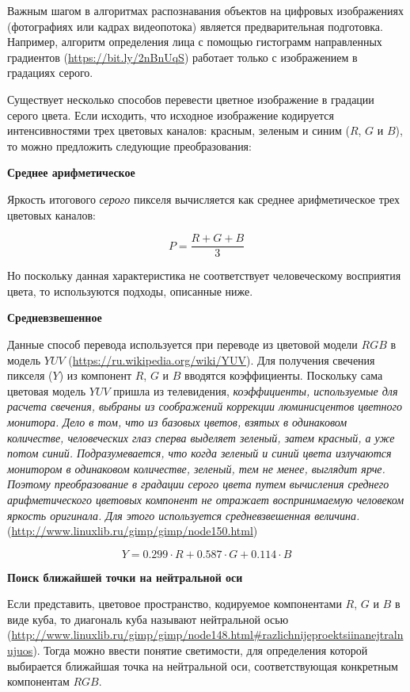 
Важным шагом в алгоритмах распознавания объектов на цифровых изображениях (фотографиях или кадрах видеопотока) является предварительная подготовка.
Например, алгоритм определения лица с помощью гистограмм направленных градиентов (\url{https://bit.ly/2nBnUqS}) работает только с изображением в градациях серого.

Существует несколько способов перевести цветное изображение в градации серого цвета.
Если исходить, что исходное изображение кодируется интенсивностями трех цветовых каналов: красным, зеленым и синим ($R$, $G$ и $B$), то можно предложить следующие преобразования:

\textbf{Среднее арифметическое}

Яркость итогового \textit{серого} пикселя вычисляется как среднее арифметическое трех цветовых каналов:

$$P = \frac{R+G+B}{3}$$

Но поскольку данная характеристика не соответствует человеческому восприятия цвета, то используются подходы, описанные ниже.

\textbf{Средневзвешенное}

Данные способ перевода используется при переводе из цветовой модели $RGB$ в модель $YUV$ (\url{https://ru.wikipedia.org/wiki/YUV}).
Для получения свечения пикселя ($Y$) из компонент $R$, $G$ и $B$ вводятся коэффициенты. Поскольку сама цветовая модель $YUV$ пришла из телевидения, \textit{коэффициенты, используемые для расчета свечения, выбраны из соображений коррекции люминисцентов цветного монитора.
Дело в том, что из базовых цветов, взятых в одинаковом количестве, человеческих глаз сперва выделяет зеленый, затем красный, а уже потом синий. Подразумевается, что когда зеленый и синий цвета излучаются монитором в одинаковом количестве, зеленый, тем не менее, выглядит ярче. Поэтому преобразование в градации серого цвета путем вычисления среднего арифметического цветовых компонент не отражает воспринимаемую человеком яркость оригинала.
Для этого используется средневзвешенная величина.} (\url{http://www.linuxlib.ru/gimp/gimp/node150.html})

$$Y = 0.299 \cdot R + 0.587 \cdot G + 0.114 \cdot B$$

\textbf{Поиск ближайшей точки на нейтральной оси}

Если представить, цветовое пространство, кодируемое компонентами $R$, $G$ и $B$ в виде куба, то диагональ куба называют нейтральной осью (\url{http://www.linuxlib.ru/gimp/gimp/node148.html#razlichnijeproektsiinanejtralnujuos}).
Тогда можно ввести понятие светимости, для определения которой выбирается ближайшая точка на нейтральной оси, соответствующая конкретным компонентам $RGB$.

